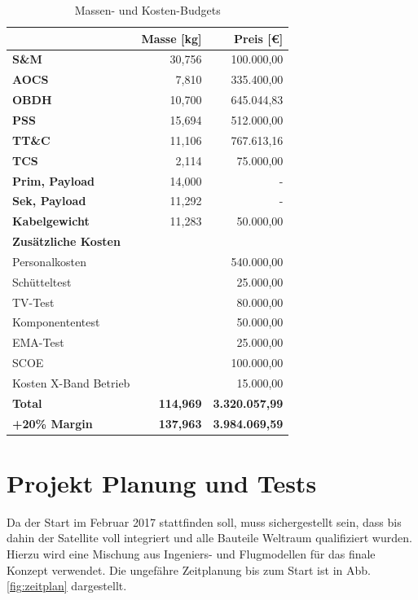 \documentclass[twoside]{article}
\begin{document}
\begin{multicols}{2}
         \begin{table}[H]
            \centering
            \begin{tabular}{lrr}
               \toprule    
               & \textbf{Masse [kg}] & \textbf{Preis [\euro]}\\
               \midrule
               \midrule
               \textbf{S\&M} & 30,756 & 100.000,00\\
               \textbf{AOCS}  & 7,810 & 335.400,00\\
               \textbf{OBDH} & 10,700 & 645.044,83\\
               \textbf{PSS} & 15,694 & 512.000,00\\
               \textbf{TT\&C} & 11,106 & 767.613,16\\
               \textbf{TCS} & 2,114 & 75.000,00\\
               \textbf{Prim, Payload} & 14,000 & -\\
               \textbf{Sek, Payload} & 11,292 & -\\
               \textbf{Kabelgewicht} &  11,283 & 50.000,00\\
               \textbf{Zusätzliche Kosten} &  & \\
               \midrule
               Personalkosten &  & 540.000,00\\
               Schütteltest &  & 25.000,00\\
               TV-Test &  & 80.000,00\\
               Komponententest &  & 50.000,00\\
               EMA-Test &  & 25.000,00\\
               SCOE &  & 100.000,00\\
               Kosten X-Band Betrieb &  & 15.000,00\\
               \midrule
               \midrule
               \textbf{Total} & \textbf{114,969} & \textbf{3.320.057,99}\\
               \midrule
               \textbf{+20\% Margin} & \textbf{137,963} & \textbf{3.984.069,59}\\
               \bottomrule 
            \end{tabular}
            \caption{Massen- und Kosten-Budgets}
            \label{tab:bduget_mass_kosten}
         \end{table}

         \section{Projekt Planung und Tests}
         Da der Start im Februar 2017 stattfinden soll, muss sichergestellt sein, dass bis dahin der Satellite voll integriert und alle Bauteile Weltraum qualifiziert wurden. 
         Hierzu wird eine Mischung aus Ingeniers- und Flugmodellen für das finale Konzept verwendet. Die ungefähre Zeitplanung bis zum Start ist in Abb. \ref{fig:zeitplan} dargestellt.


\end{multicols}
\end{document}
